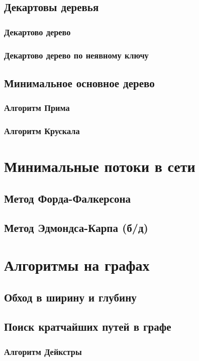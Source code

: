 \documentclass[a4paper]{article}
\begin{document}
\subsection{Декартовы деревья}
\subsubsection{Декартово дерево}
\subsubsection{Декартово дерево по неявному ключу}

\subsection{Минимальное основное дерево}
\subsubsection{Алгоритм Прима}
\subsubsection{Алгоритм Крускала}

\section{Минимальные потоки в сети}
\subsection{Метод Форда-Фалкерсона}
\subsection{Метод Эдмондса-Карпа (б/д)}

\section{Алгоритмы на графах}
\subsection{Обход в ширину и глубину}
\subsection{Поиск кратчайших путей в графе}
\subsubsection{Алгоритм Дейкстры}
\end{document}
